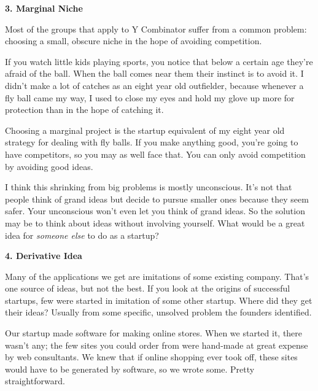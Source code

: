 \textbf{3. Marginal Niche}

Most of the groups that apply to Y Combinator
                    suffer from a common problem: choosing a small, obscure
                    niche in the hope of avoiding competition.

If you
                    watch little kids playing sports, you notice that below a
                    certain age they're afraid of the ball. When the ball comes
                    near them their instinct is to avoid it. I didn't make a lot
                    of catches as an eight year old outfielder, because whenever
                    a fly ball came my way, I used to close my eyes and hold my
                    glove up more for protection than in the hope of catching
                    it.

Choosing a marginal project is the startup
                    equivalent of my eight year old strategy for dealing with
                    fly balls. If you make anything good, you're going to have
                    competitors, so you may as well face that. You can only
                    avoid competition by avoiding good ideas.

I think
                    this shrinking from big problems is mostly unconscious. It's
                    not that people think of grand ideas but decide to pursue
                    smaller ones because they seem safer. Your unconscious won't
                    even let you think of grand ideas. So the solution may be to
                    think about ideas without involving yourself. What would be
                    a great idea for \emph{someone else} to do as a startup?

\textbf{4. Derivative Idea}

Many of the applications we get are imitations
                    of some existing company. That's one source of ideas, but
                    not the best. If you look at the origins of successful
                    startups, few were started in imitation of some other
                    startup. Where did they get their ideas? Usually from some
                    specific, unsolved problem the founders identified.

Our
                    startup made software for making online stores. When we
                    started it, there wasn't any; the few sites you could order
                    from were hand-made at great expense by web consultants. We
                    knew that if online shopping ever took off, these sites
                    would have to be generated by software, so we wrote some.
                    Pretty straightforward.

